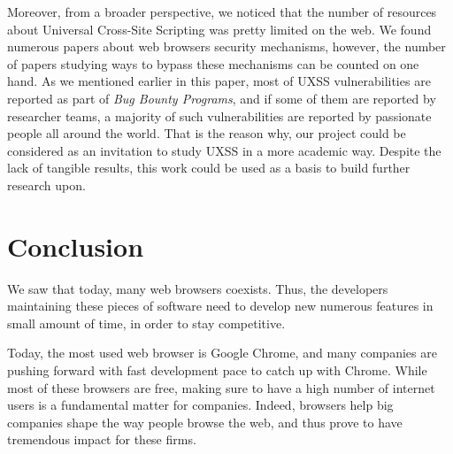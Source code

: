 \documentclass[journal]{IEEEtran}
\begin{document}
\medskip

Moreover, from a broader perspective, we noticed that the number of resources about Universal Cross-Site Scripting was pretty limited on the web. We found numerous papers about web browsers security mechanisms, however, the number of papers studying ways to bypass these mechanisms can be counted on one hand. As we mentioned earlier in this paper, most of UXSS vulnerabilities are reported as part of \emph{Bug Bounty Programs}, and if some of them are reported by researcher teams, a majority of such vulnerabilities are reported by passionate people all around the world. That is the reason why, our project could be considered as an invitation to study UXSS in a more academic way. Despite the lack of tangible results, this work could be used as a basis to build further research upon.


\section{Conclusion}

We saw that today, many web browsers coexists. Thus, the developers maintaining these pieces of software need to develop new numerous features in small amount of time, in order to stay competitive.

\medskip

Today, the most used web browser is Google Chrome, and many companies are pushing forward with fast development pace to catch up with Chrome. While most of these browsers are free, making sure to have a high number of internet users is a fundamental matter for companies. Indeed, browsers help big companies shape the way people browse the web, and thus prove to have tremendous impact for these firms.

\medskip
\end{document}
